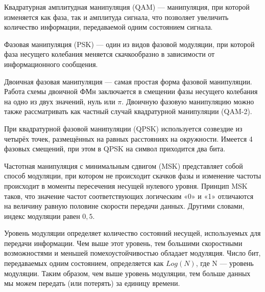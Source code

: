 Квадратурная амплитудная манипуляция (QAM) — манипуляция, при которой изменяется как фаза, так и амплитуда сигнала, что позволяет увеличить количество информации, передаваемой одним состоянием сигнала. 

Фазовая манипуляция (PSK) — один из видов фазовой модуляции, при которой фаза несущего колебания меняется скачкообразно в зависимости от информационного сообщения. 

Двоичная фазовая манипуляция — самая простая форма фазовой манипуляции. Работа схемы двоичной ФМн заключается в смещении фазы несущего колебания на одно из двух значений, нуль или $\pi$. Двоичную фазовую манипуляцию можно также рассматривать как частный случай квадратурной манипуляции (QAM-2). 

При квадратурной фазовой манипуляции (QPSK) используется созвездие из четырёх точек, размещённых на равных расстояниях на окружности. Имеется 4 фазовых смещений, при этом в QPSK на символ приходится два бита. 

Частотная манипуляция с минимальным сдвигом (MSK) представляет собой способ модуляции, при котором не происходит скачков фазы и изменение частоты происходит в моменты пересечения несущей нулевого уровня. Принцип MSK таков, что значение частот соответствующих логическим «0» и «1» отличаются на величину равную половине скорости передачи данных. Другими словами, индекс модуляции равен $0,5$. 

Уровень модуляции определяет количество состояний несущей, используемых для передачи информации. Чем выше этот уровень, тем большими скоростными возможностями и меньшей помехоустойчивостью обладает модуляция. Число бит, передаваемых одним состоянием, определяется как $Log (N)$, где N — уровень модуляции. Таким образом, чем выше уровень модуляции, тем больше данных мы можем передать (или потерять) за единицу времени.
